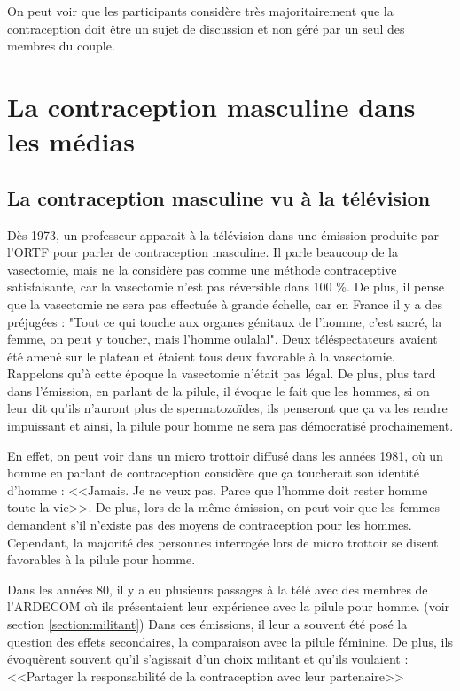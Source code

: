 \documentclass[12pt,a4paper]{report}
\begin{document}
On peut voir que les participants considère très majoritairement que la contraception doit être un sujet de discussion et non géré par un seul des membres du couple.

\section{La contraception masculine dans les médias}

\subsection{La contraception masculine vu à la télévision}

Dès 1973, un professeur apparait à la télévision dans une émission produite par l'ORTF pour parler de contraception masculine. Il parle beaucoup de la vasectomie, mais ne la considère pas comme une méthode contraceptive satisfaisante, car la vasectomie n'est pas réversible dans 100 \%. De plus, il pense que la vasectomie ne sera pas effectuée à grande échelle, car en France il y a des préjugées : "Tout ce qui touche aux organes génitaux de l'homme, c'est sacré, la femme, on peut y toucher, mais l'homme oulalal". Deux téléspectateurs avaient été amené sur le plateau et étaient tous deux favorable à la vasectomie. \cite{ProfesseurNetterContraception} Rappelons qu'à cette époque la vasectomie n'était pas légal. \cite{guillaumedaudinContraceptesEnqueteDernier2022} De plus, plus tard dans l'émission, en parlant de la pilule, il évoque le fait que les hommes, si on leur dit qu'ils n'auront plus de spermatozoïdes, ils penseront que ça va les rendre impuissant et ainsi, la pilule pour homme ne sera pas démocratisé prochainement. \cite{inaactuPilulePourHomme2019}

En effet, on peut voir dans un micro trottoir diffusé dans les années 1981, où un homme en parlant de contraception considère que ça toucherait son identité d'homme : <<Jamais. Je ne veux pas. Parce que l'homme doit rester homme toute la vie>>. De plus, lors de la même émission, on peut voir que les femmes demandent s'il n'existe pas des moyens de contraception pour les hommes. Cependant, la majorité des personnes interrogée lors de micro trottoir se disent favorables à la pilule pour homme. \cite{MicrotrottoirHommesPour}\cite{PilulePourHomme}

Dans les années 80, il y a eu plusieurs passages à la télé avec des membres de l'ARDECOM où ils présentaient leur expérience avec la pilule pour homme. (voir section \ref{section:militant}) Dans ces émissions, il leur a souvent été posé la question des effets secondaires, la comparaison avec la pilule féminine. De plus, ils évoquèrent souvent qu'il s'agissait d'un choix militant et qu'ils voulaient : <<Partager la responsabilité de la contraception avec leur partenaire>> \cite{inaactuPilulePourHomme2019}\cite{1980HommeVient}
\end{document}
